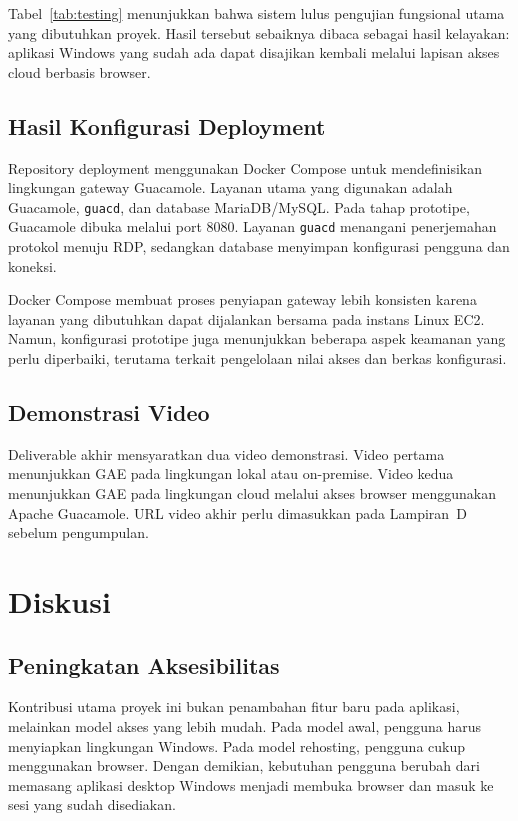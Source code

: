 \documentclass[conference]{IEEEtran}
\begin{document}
Tabel~\ref{tab:testing} menunjukkan bahwa sistem lulus pengujian fungsional utama yang dibutuhkan proyek. Hasil tersebut sebaiknya dibaca sebagai hasil kelayakan: aplikasi Windows yang sudah ada dapat disajikan kembali melalui lapisan akses cloud berbasis browser.

\subsection{Hasil Konfigurasi Deployment}

Repository deployment menggunakan Docker Compose untuk mendefinisikan lingkungan gateway Guacamole. Layanan utama yang digunakan adalah Guacamole, \texttt{guacd}, dan database MariaDB/MySQL. Pada tahap prototipe, Guacamole dibuka melalui port 8080. Layanan \texttt{guacd} menangani penerjemahan protokol menuju RDP, sedangkan database menyimpan konfigurasi pengguna dan koneksi.

Docker Compose membuat proses penyiapan gateway lebih konsisten karena layanan yang dibutuhkan dapat dijalankan bersama pada instans Linux EC2. Namun, konfigurasi prototipe juga menunjukkan beberapa aspek keamanan yang perlu diperbaiki, terutama terkait pengelolaan nilai akses dan berkas konfigurasi.

\subsection{Demonstrasi Video}

Deliverable akhir mensyaratkan dua video demonstrasi. Video pertama menunjukkan GAE pada lingkungan lokal atau on-premise. Video kedua menunjukkan GAE pada lingkungan cloud melalui akses browser menggunakan Apache Guacamole. URL video akhir perlu dimasukkan pada Lampiran~D sebelum pengumpulan.

\section{Diskusi}

\subsection{Peningkatan Aksesibilitas}

Kontribusi utama proyek ini bukan penambahan fitur baru pada aplikasi, melainkan model akses yang lebih mudah. Pada model awal, pengguna harus menyiapkan lingkungan Windows. Pada model rehosting, pengguna cukup menggunakan browser. Dengan demikian, kebutuhan pengguna berubah dari memasang aplikasi desktop Windows menjadi membuka browser dan masuk ke sesi yang sudah disediakan.
\end{document}
